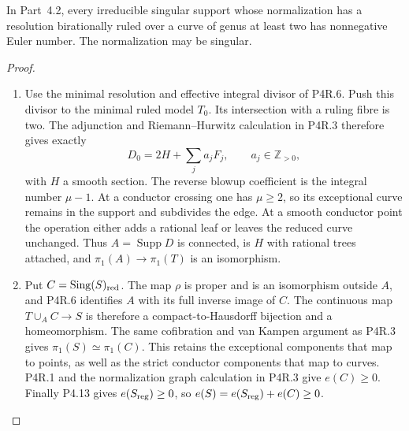 \begin{proposition}[P4R.7]\hypertarget{tag-02YJ}{}\label{night:P4R.7}\label{stmt:P4R.7}

In Part~4.2, every irreducible singular
support whose normalization has a
resolution birationally ruled over a
curve of genus at least two has
nonnegative Euler number. The
normalization may be singular.
\end{proposition}
\begin{proof}

\begin{enumerate}[label={$\langle1\rangle$\arabic*.},leftmargin=*]
\item Use the minimal resolution and effective
integral divisor of P4R.6. Push this
divisor to the minimal ruled model
$T_0$. Its intersection with a ruling
fibre is two. The adjunction and
Riemann--Hurwitz calculation in P4R.3
therefore gives exactly
\[
 D_0=2H+\sum_j a_jF_j,
 \qquad a_j\in\mathbb Z_{>0},
\]
with $H$ a smooth section. The reverse
blowup coefficient is the integral
number $\mu-1$. At a conductor crossing
one has $\mu\ge2$, so its exceptional
curve remains in the support and
subdivides the edge. At a smooth
conductor point the operation either
adds a rational leaf or leaves the
reduced curve unchanged. Thus
$A=\operatorname{Supp}D$ is connected,
is $H$ with rational trees attached,
and $\pi_1(A)\to\pi_1(T)$ is an
isomorphism.

\item Put $C=\operatorname{Sing}(S)_{\rm red}$.
The map $\rho$ is proper and is an
isomorphism outside $A$, and P4R.6
identifies $A$ with its full inverse
image of $C$. The continuous map
$T\cup_A C\to S$ is therefore a
compact-to-Hausdorff bijection and a
homeomorphism. The same cofibration
and van Kampen argument as P4R.3 gives
$\pi_1(S)\simeq\pi_1(C)$. This retains
the exceptional components that map
to points, as well as the strict
conductor components that map to
curves. P4R.1 and the normalization
graph calculation in P4R.3 give
$e(C)\ge0$. Finally P4.13 gives
$e(S_{\rm reg})\ge0$, so
$e(S)=e(S_{\rm reg})+e(C)\ge0$.

\end{enumerate}
\end{proof}